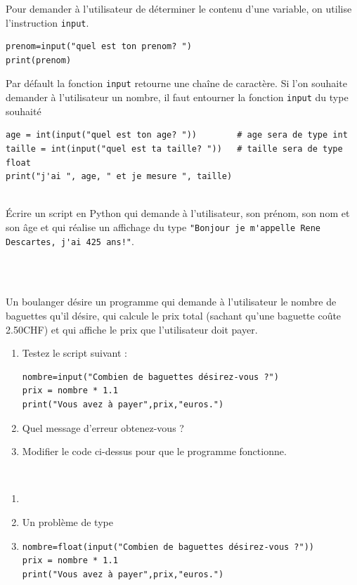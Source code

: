 \documentclass[a4paper,12pt]{article}
\begin{document}
\begin{apprendre}
	Pour demander à l’utilisateur de déterminer le contenu d’une variable, on utilise l’instruction \lstinline{input}.
	\begin{lstlisting}[numbers=none]
prenom=input("quel est ton prenom? ")
print(prenom)
	\end{lstlisting}
	Par défault la fonction \lstinline{input} retourne une chaîne de caractère. Si l'on souhaite demander à l'utilisateur un nombre, il faut entourner la fonction \lstinline{input} du type souhaité
	\begin{lstlisting}[numbers=none]
age = int(input("quel est ton age? "))        # age sera de type int
taille = int(input("quel est ta taille? "))   # taille sera de type float
print("j'ai ", age, " et je mesure ", taille)  
	\end{lstlisting}
\end{apprendre}

\exo{}  ~\\ 
 Écrire un script en Python qui demande à l'utilisateur, son prénom, son nom et son âge et qui réalise un affichage du type \lstinline{"Bonjour je m'appelle Rene Descartes, j'ai 425 ans!"}.
 \begin{correction}
 	~\\ 
 	
 \end{correction}
\finexo

\newpage

\exo{}  ~\\ 
  Un boulanger désire un programme qui demande à l'utilisateur le nombre de baguettes qu'il désire, qui calcule le prix total (sachant qu'une baguette coûte 2.50CHF) et qui affiche le prix que l'utilisateur doit payer. 
\begin{enumerate}[label=\alph*)]
	\item  	Testez le script suivant :
	\begin{lstlisting}[numbers=none]
nombre=input("Combien de baguettes désirez-vous ?")
prix = nombre * 1.1
print("Vous avez à payer",prix,"euros.")
	\end{lstlisting}
	\item Quel message d'erreur obtenez-vous ?
	
	\item Modifier le code ci-dessus pour que le programme fonctionne.
\end{enumerate}
\begin{correction}
	~\\ 
	\begin{enumerate}[label=\alph*)]
		\item  	\ 

		\item Un problème de type
		
		\item 
		\begin{lstlisting}[numbers=none]
nombre=float(input("Combien de baguettes désirez-vous ?"))
prix = nombre * 1.1
print("Vous avez à payer",prix,"euros.")
		\end{lstlisting}
	\end{enumerate}
\end{correction}
\finexo
\end{document}
